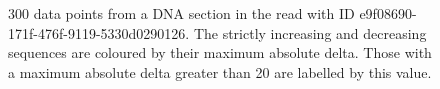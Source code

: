 \begin{figure}
\centering

\caption{\label{fig:epsilon}300 data points from a DNA section in the read with ID e9f08690-171f-476f-9119-5330d0290126. The strictly increasing and decreasing sequences are coloured by their maximum absolute delta. Those with a maximum absolute delta greater than 20 are labelled by this value.}
\end{figure}
